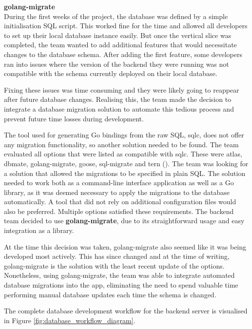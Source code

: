 \newpage{}

\textbf{golang-migrate}\\
During the first weeks of the project, the database was defined by a simple
initialisation SQL script. This worked fine for the time and allowed all
developers to set up their local database instance easily. But once the vertical
slice was completed, the team wanted to add additional features that would
necessitate changes to the database schema. After adding the first feature, some
developers ran into issues where the version of the backend they were running
was not compatible with the schema currently deployed on their local database.

Fixing these issues was time consuming and they were likely going to reappear
after future database changes. Realising this, the team made the decision to
integrate a database migration solution to automate this tedious process and
prevent future time losses during development.

The tool used for generating Go bindings from the raw SQL, sqlc, does not offer
any migration functionality, so another solution needed to be found. The team
evaluated all options that were listed as compatible with sqlc. These were
atlas, dbmate, golang-migrate, goose, sql-migrate and tern
(\cite{sqlc_updating_database_schema}). The team was looking for a solution that
allowed the migrations to be specified in plain SQL. The solution needed to work
both as a command-line interface application as well as a Go library, as it was
deemed necessary to apply the migrations to the database automatically. A tool
that did not rely on additional configuration files would also be preferred.
Multiple options satisfied these requirements. The backend team decided to use
\textbf{golang-migrate}, due to its straightforward usage and easy integration as a
library.

At the time this decision was taken, golang-migrate also seemed like it was
being developed most actively. This has since changed and at the time of
writing, golang-migrate is the solution with the least recent update of the
options. Nonetheless, using golang-migrate, the team was able to integrate
automated database migrations into the app, eliminating the need to spend
valuable time performing manual database updates each time the schema is
changed.

The complete database development workflow for the backend server is visualised
in Figure \ref{fig:database_workflow_diagram}.


